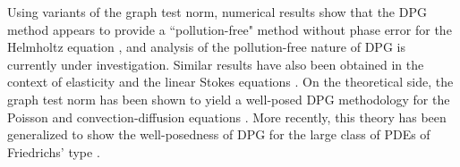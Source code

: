 
%


Using variants of the graph test norm, numerical results show that the DPG method appears to provide a ``pollution-free" method without phase error for the Helmholtz equation \cite{DPG4}, and analysis of the pollution-free nature of DPG is currently under investigation. Similar results have also been obtained in the context of elasticity \cite{DPGElas} and the linear Stokes equations \cite{Camellia}. On the theoretical side, the graph test norm has been shown to yield a well-posed DPG methodology for the Poisson and convection-diffusion equations \cite{analysisDPG}. More recently, this theory has been generalized to show the well-posedness of DPG for the large class of PDEs of Friedrichs' type \cite{Bui-ThanhDemkowiczGhattas11b}.  

